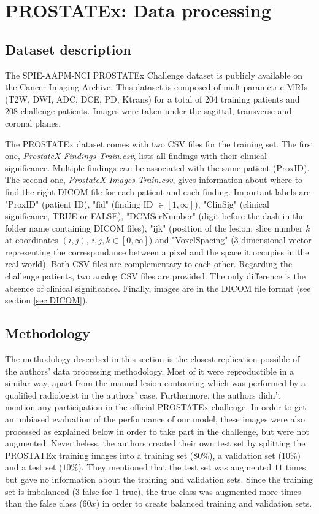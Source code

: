 \section{PROSTATEx: Data processing}
\label{sec:prostatex_data_processing}
\subsection{Dataset description}
\label{sec:prostatex_dataset_description}
The SPIE-AAPM-NCI PROSTATEx Challenge dataset is publicly available on the Cancer Imaging Archive. This dataset is composed of multiparametric MRIs (T2W, DWI, ADC, DCE, PD, Ktrans) for a total of 204 training patients and 208 challenge patients. Images were taken under the sagittal, transverse and coronal planes.

The PROSTATEx dataset comes with two CSV files for the training set. The first one, \textit{ProstateX-Findings-Train.csv}, lists all findings with their clinical significance. Multiple findings can be associated with the same patient (ProxID). The second one, \textit{ProstateX-Images-Train.csv}, gives information about where to find the right DICOM file for each patient and each finding. Important labels are "ProxID" (patient ID), "fid" (finding ID $\in [1,\infty]$), "ClinSig" (clinical significance, TRUE or FALSE), "DCMSerNumber" (digit before the dash in the folder name containing DICOM files), "ijk" (position of the lesion: slice number $k$ at coordinates $(i,j)$, $i,j,k \in [0,\infty]$) and "VoxelSpacing" (3-dimensional vector representing the correspondance between a pixel and the space it occupies in the real world). Both CSV files are complementary to each other. Regarding the challenge patients, two analog CSV files are provided. The only difference is the absence of clinical significance. Finally, images are in the DICOM file format (see section \ref{sec:DICOM}). 


\subsection{Methodology}
The methodology described in this section is the closest replication possible of the authors' data processing methodology. Most of it were reproductible in a similar way, apart from the manual lesion contouring which was performed by a qualified radiologist in the authors' case. Furthermore, the authors didn't mention any participation in the official PROSTATEx challenge. In order to get an unbiased evaluation of the performance of our model, these images were also processed as explained below in order to take part in the challenge, but were not augmented. Nevertheless, the authors created their own test set by splitting the PROSTATEx training images into a training set ($80\%$), a validation set ($10\%$) and a test set ($10\%$). They mentioned that the test set was augmented $11$ times but gave no information about the training and validation sets. Since the training set is imbalanced (3 false for 1 true), the true class was augmented more times than the false class ($60x$) in order to create balanced training and validation sets. 


